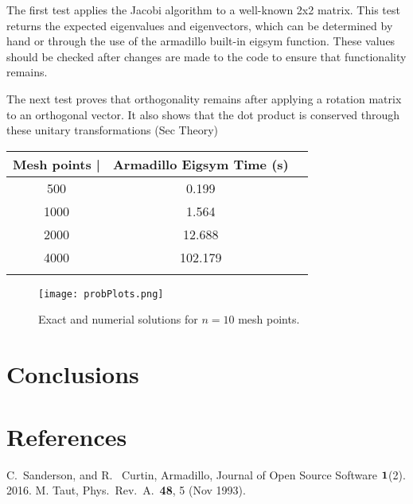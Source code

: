 \documentclass[10pt,showpacs,preprintnumbers,amsmath,amssymb,aps,prl,twocolumn,groupedaddress,superscriptaddress,showkeys]{revtex4-1}
\begin{document}
\quad The first test applies the Jacobi algorithm to a well-known 2x2 matrix. This test returns the expected eigenvalues and eigenvectors, which can be determined by hand or through the use of the armadillo built-in eigsym function. These values should be checked after changes are made to the code to ensure that functionality remains.

\quad The next test proves that orthogonality remains after applying a rotation matrix to an orthogonal vector. It also shows that the dot product is conserved through these unitary transformations (Sec Theory)

\begin{center}
		\begin{tabular}{ccc}
			\hline \hline
			Mesh points |\quad & Armadillo Eigsym Time (s) \\
			\hline		
			500 & 0.199  \\
			1000 & 1.564  \\
			2000 & 12.688  \\
			4000 &  102.179\\
			\hline
			\label{timingtable}
		\end{tabular}
	\end{center}
	
\begin{widetext}
\begin{figure}[hbtp]
\texttt{[image: probPlots.png]}
\caption{Exact and numerial solutions for $n=10$ mesh points.} 
\label{probability}
\end{figure}
\end{widetext}

\section{Conclusions}

\section{References}
\begin{thebibliography}{99}
 C.~Sanderson, and R.~ Curtin, Armadillo, Journal of Open Source Software $\bf{1}$(2). 2016.
 M. Taut,  Phys.~Rev.~A.~{\bf 48}, 5 (Nov 1993).
\end{thebibliography}


%
%	
\end{document}
